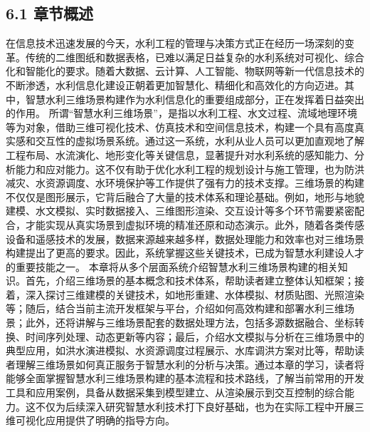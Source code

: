 \subsection{6.1 章节概述}\label{ux7ae0ux8282ux6982ux8ff0} 在信息技术迅速发展的今天，水利工程的管理与决策方式正在经历一场深刻的变革。传统的二维图纸和数据表格，已难以满足日益复杂的水利系统对可视化、综合化和智能化的要求。随着大数据、云计算、人工智能、物联网等新一代信息技术的不断渗透，水利信息化建设正朝着更加智慧化、精细化和高效化的方向迈进。其中，智慧水利三维场景构建作为水利信息化的重要组成部分，正在发挥着日益突出的作用。 所谓``智慧水利三维场景''，是指以水利工程、水文过程、流域地理环境等为对象，借助三维可视化技术、仿真技术和空间信息技术，构建一个具有高度真实感和交互性的虚拟场景系统。通过这一系统，水利从业人员可以更加直观地了解工程布局、水流演化、地形变化等关键信息，显著提升对水利系统的感知能力、分析能力和应对能力。这不仅有助于优化水利工程的规划设计与施工管理，也为防洪减灾、水资源调度、水环境保护等工作提供了强有力的技术支撑。三维场景的构建不仅仅是图形展示，它背后融合了大量的技术体系和理论基础。例如，地形与地貌建模、水文模拟、实时数据接入、三维图形渲染、交互设计等多个环节需要紧密配合，才能实现从真实场景到虚拟环境的精准还原和动态演示。此外，随着各类传感设备和遥感技术的发展，数据来源越来越多样，数据处理能力和效率也对三维场景构建提出了更高的要求。因此，系统掌握这些关键技术，已成为智慧水利建设人才的重要技能之一。 本章将从多个层面系统介绍智慧水利三维场景构建的相关知识。首先，介绍三维场景的基本概念和技术体系，帮助读者建立整体认知框架；接着，深入探讨三维建模的关键技术，如地形重建、水体模拟、材质贴图、光照渲染等；随后，结合当前主流开发框架与平台，介绍如何高效构建和部署水利三维场景；此外，还将讲解与三维场景配套的数据处理方法，包括多源数据融合、坐标转换、时间序列处理、动态更新等内容；最后，介绍水文模拟与分析在三维场景中的典型应用，如洪水演进模拟、水资源调度过程展示、水库调洪方案对比等，帮助读者理解三维场景如何真正服务于智慧水利的分析与决策。通过本章的学习，读者将能够全面掌握智慧水利三维场景构建的基本流程和技术路线，了解当前常用的开发工具和应用案例，具备从数据采集到模型建立、从渲染展示到交互控制的综合能力。这不仅为后续深入研究智慧水利技术打下良好基础，也为在实际工程中开展三维可视化应用提供了明确的指导方向。 